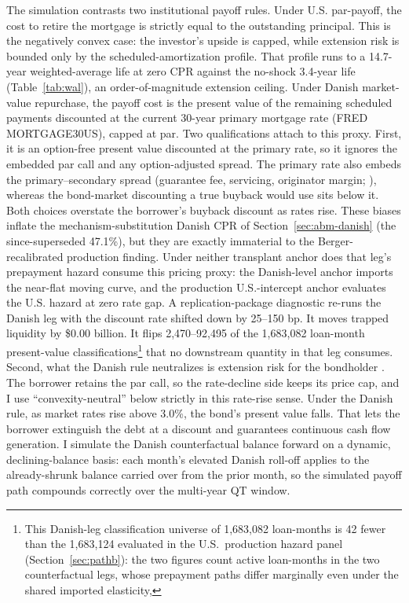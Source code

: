 \documentclass[12pt]{article}
\begin{document}
The simulation contrasts two institutional payoff rules. Under U.S. par-payoff, the cost to retire the mortgage is strictly equal to the outstanding principal. This is the negatively convex case: the investor's upside is capped, while extension risk is bounded only by the scheduled-amortization profile. That profile runs to a 14.7-year weighted-average life at zero CPR against the no-shock 3.4-year life (Table~\ref{tab:wal}), an order-of-magnitude extension ceiling. Under Danish market-value repurchase, the payoff cost is the present value of the remaining scheduled payments discounted at the current 30-year primary mortgage rate (FRED MORTGAGE30US), capped at par. Two qualifications attach to this proxy. First, it is an option-free present value discounted at the primary rate, so it ignores the embedded par call and any option-adjusted spread. The primary rate also embeds the primary--secondary spread (guarantee fee, servicing, originator margin; \citealp{fuster2013}), whereas the bond-market discounting a true buyback would use sits below it. Both choices overstate the borrower's buyback discount as rates rise. These biases inflate the mechanism-substitution Danish CPR of Section~\ref{sec:abm-danish} (the since-superseded 47.1\%), but they are exactly immaterial to the Berger-recalibrated production finding. Under neither transplant anchor does that leg's prepayment hazard consume this pricing proxy: the Danish-level anchor imports the near-flat moving curve, and the production U.S.-intercept anchor evaluates the U.S. hazard at zero rate gap. A replication-package diagnostic re-runs the Danish leg with the discount rate shifted down by 25--150 bp. It moves trapped liquidity by \$0.00 billion. It flips 2,470--92,495 of the 1,683,082 loan-month present-value classifications\footnote{This Danish-leg classification universe of 1{,}683{,}082 loan-months is 42 fewer than the 1{,}683{,}124 evaluated in the U.S.\ production hazard panel (Section~\ref{sec:pathb}): the two figures count active loan-months in the two counterfactual legs, whose prepayment paths differ marginally even under the shared imported elasticity,} that no downstream quantity in that leg consumes. Second, what the Danish rule neutralizes is extension risk for the bondholder \citep{berger2026}. The borrower retains the par call, so the rate-decline side keeps its price cap, and I use ``convexity-neutral'' below strictly in this rate-rise sense. Under the Danish rule, as market rates rise above 3.0\%, the bond's present value falls. That lets the borrower extinguish the debt at a discount and guarantees continuous cash flow generation. I simulate the Danish counterfactual balance forward on a dynamic, declining-balance basis: each month's elevated Danish roll-off applies to the already-shrunk balance carried over from the prior month, so the simulated payoff path compounds correctly over the multi-year QT window.
\end{document}
